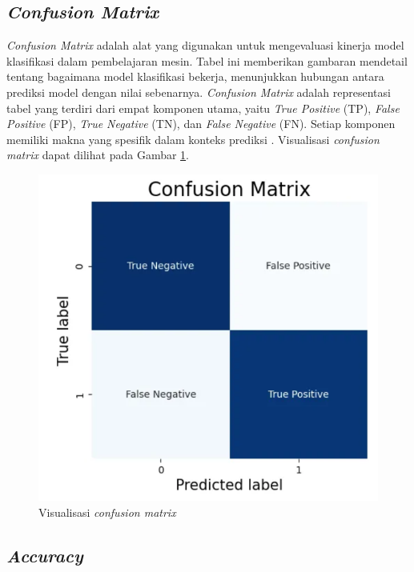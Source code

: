 \subsection{\emph{Confusion Matrix}}

\emph{Confusion Matrix} adalah alat yang digunakan untuk mengevaluasi kinerja model klasifikasi dalam pembelajaran mesin. Tabel ini memberikan gambaran mendetail tentang bagaimana model klasifikasi bekerja, menunjukkan hubungan antara prediksi model dengan nilai sebenarnya. \emph{Confusion Matrix} adalah representasi tabel yang terdiri dari empat komponen utama, yaitu \emph{True Positive} (TP), \emph{False Positive} (FP), \emph{True Negative} (TN), dan \emph{False Negative} (FN). Setiap komponen memiliki makna yang spesifik dalam konteks prediksi \cite{provost2013data}. Visualisasi \emph{confusion matrix} dapat dilihat pada Gambar \ref{fig:confusion}.

\begin{figure} [ht] \centering
    \includegraphics[scale=0.3]{gambar/bab2/confusion.png}
    \caption{Visualisasi \emph{confusion matrix}}
    \label{fig:confusion}
\end{figure}

\subsection{\emph{Accuracy}}
\label{subsec:acc_klasifikasi}

